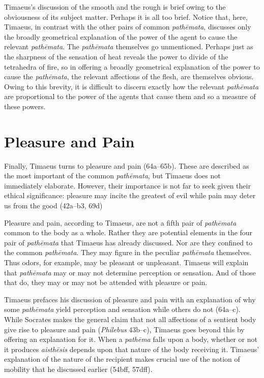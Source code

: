 Timaeus's discussion of the smooth and the rough is brief owing to the obviousness of its subject matter. Perhaps it is all too brief. Notice that, here, Timaeus, in contrast with the other pairs of common \emph{pathēmata}, discusses only the broadly geometrical explanation of the power of the agent to cause the relevant \emph{pathēmata}. The \emph{pathēmata} themselves go unmentioned. Perhaps just as the sharpness of the sensation of heat reveals the power to divide of the tetrahedra of fire, so in offering a broadly geometrical explanation of the power to cause the \emph{pathēmata}, the relevant affections of the flesh, are themselves obvious. Owing to this brevity, it is difficult to discern exactly how the relevant \emph{pathēmata} are proportional to the power of the agents that cause them and so a measure of these powers.


\section{Pleasure and Pain} %
\label{sec:pleasure_and_pain}

Finally, Timaeus turns to pleasure and pain (64a–65b). These are described as the most important of the common \emph{pathēmata}, but Timaeus does not immediately elaborate. However, their importance is not far to seek given their ethical significance: pleasure may incite the greatest of evil while pain may deter us from the good (42a--b3, 69d)

Pleasure and pain, according to Timaeus, are not a fifth pair of \emph{pathēmata} common to the body as a whole. Rather they are potential elements in the four pair of \emph{pathēmata} that Timaeus has already discussed. Nor are they confined to the common \emph{pathēmata}. They may figure in the peculiar \emph{pathēmata} themselves. Thus odors, for example, may be pleasant or unpleasant. Timaeus will explain that \emph{pathēmata} may or may not determine perception or sensation. And of those that do, they may or may not be attended with pleasure or pain.

Timaeus prefaces his discussion of pleasure and pain with an explanation of why some \emph{pathēmata} yield perception and sensation while others do not (64a--c). While Socrates makes the general claim that not all affections of a sentient body give rise to pleasure and pain (\emph{Philebus} 43b--c), Timaeus goes beyond this by offering an explanation for it.  When a \emph{pathēma} falls upon a body, whether or not it produces \emph{aisthēsis} depends upon that nature of the body receiving it. Timaeus' explanation of the nature of the recipient makes crucial use of the notion of mobility that he discussed earlier (54bff, 57dff). 

